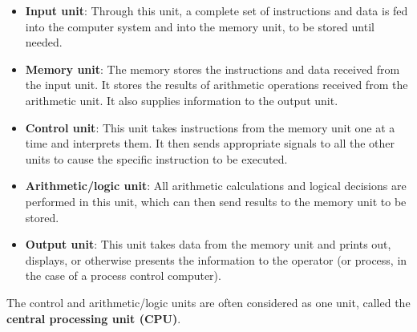         \begin{itemize}
            \item \textbf{Input unit}: Through this unit, a complete set of instructions and data
                is fed into the computer system and into the memory unit, to be stored until
                needed.
            \item \textbf{Memory unit}: The memory stores the instructions and data received from
                the input unit. It stores the results of arithmetic operations received from
                the arithmetic unit. It also supplies information to the output unit.
            \item \textbf{Control unit}: This unit takes instructions from the memory unit one
                at a time and interprets them. It then sends appropriate signals to all the
                other units to cause the specific instruction to be executed.
            \item \textbf{Arithmetic/logic unit}: All arithmetic calculations and logical
                decisions are performed in this unit, which can then send results to the memory
                unit to be stored.
            \item \textbf{Output unit}: This unit takes data from the memory unit and prints out,
                displays, or otherwise presents the information to the operator (or process,
                in the case of a process control computer).
        \end{itemize}
        \par The control and arithmetic/logic units are often considered as one unit, called the
        \textbf{central processing unit (CPU)}.

